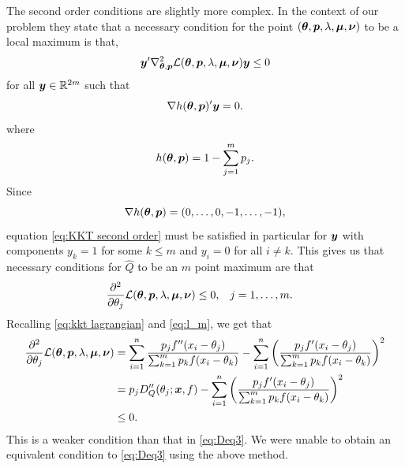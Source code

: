 	The second order conditions are slightly more complex. In the context of our problem they state \cite[Proposition 3.3.1]{Bertsekas1995-mh} that a necessary condition for the point $({\bm{{\theta}}}, {\bm{{p}}}, \lambda, {\bm{{\mu}}}, {\bm{{\nu}}})$ to be a local maximum is that,
	\begin{equation}
		{\bm{{y}}}' \nabla^2_{{\bm{{\theta}}}, {\bm{{p}}}} \mathcal{L}({\bm{{\theta}}}, {\bm{{p}}}, \lambda, {\bm{{\mu}}}, {\bm{{\nu}}}) {\bm{{y}}} \leq 0
		\label{eq:KKT second order}
	\end{equation}
	for all ${\bm{{y}}} \in \mathbb{R}^{2m}$ such that
	\begin{equation}
		\nabla h({\bm{{\theta}}}, {\bm{{p}}})' {\bm{{y}}} = 0.
	\end{equation}
	where
	\begin{equation}
		h({\bm{{\theta}}}, {\bm{{p}}}) = 1 - \sum_{j = 1}^m p_j.
	\end{equation}
	Since 
	\begin{equation}
		\nabla h({\bm{{\theta}}}, {\bm{{p}}}) = (0, \dots, 0, -1, \dots, -1),
	\end{equation}{}
	equation \eqref{eq:KKT second order} must be satisfied in particular for ${\bm{{y}}}$ with components $y_k = 1$ for some $k \leq m$ and $y_i  = 0$ for all $i \neq k$. This gives us that necessary conditions for $\hat{Q}$ to be an $m$ point maximum are that
	\begin{align}
		\frac{\partial^2}{\partial \theta_j} \mathcal{L}({\bm{{\theta}}}, {\bm{{p}}}, \lambda, {\bm{{\mu}}}, {\bm{{\nu}}}) &\leq 0, && j = 1, \dots, m.
	\end{align}
	Recalling \eqref{eq:kkt lagrangian} and \eqref{eq:l_m}, we get that
	\begin{align}
		\frac{\partial^2}{\partial \theta_j} \mathcal{L}({\bm{{\theta}}}, {\bm{{p}}}, \lambda, {\bm{{\mu}}}, {\bm{{\nu}}}) &= \sum_{i = 1}^n \frac{p_j f''(x_i - \theta_j)}{\sum_{k = 1}^m p_k f(x_i - \theta_k)} - \sum_{i = 1}^n \left(\frac{p_j f'(x_i - \theta_j)}{\sum_{k = 1}^m p_k f(x_i - \theta_k)}\right)^2 \\
		&= p_j D_Q''(\theta_j;{\bm{{x}}}, f) - \sum_{i = 1}^n \left(\frac{p_j f'(x_i - \theta_j)}{\sum_{k = 1}^m p_k f(x_i - \theta_k)}\right)^2 \\
		&\leq 0.
	\end{align}
	This is a weaker condition than that in \eqref{eq:Deq3}. We were unable to obtain an equivalent condition to \eqref{eq:Deq3} using the above method.


